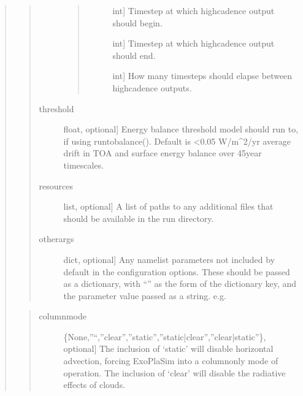 \documentclass[letterpaper,10pt,english]{sphinxmanual}
\begin{document}
\begin{fulllineitems}
\begin{fulllineitems}
\begin{quote}
\begin{quote}
\begin{description}
\begin{quote}
\begin{description}
\item[{}] \leavevmode{[}int{]}
Timestep at which high\sphinxhyphen{}cadence output should begin.

\item[{}] \leavevmode{[}int{]}
Timestep at which high\sphinxhyphen{}cadence output should end.

\item[{}] \leavevmode{[}int{]}
How many timesteps should elapse between high\sphinxhyphen{}cadence outputs.

\end{description}
\end{quote}

\item[{threshold}] \leavevmode{[}float, optional{]}
Energy balance threshold model should run to, if using runtobalance().
Default is \textless{}0.05 W/m\textasciicircum{}2/yr average drift in TOA and surface energy balance
over 45\sphinxhyphen{}year timescales.

\item[{resources}] \leavevmode{[}list, optional{]}
A list of paths to any additional files that should be available in the
run directory.

\item[{otherargs}] \leavevmode{[}dict, optional{]}
Any namelist parameters not included by default in the configuration options.
These should be passed as a dictionary, with “” as the
form of the dictionary key, and the parameter value passed as a string.
e.g. 

\end{description}
\end{quote}

\begin{quote}
\begin{description}
\item[{columnmode}] \leavevmode{[}\{None,”\sphinxhyphen{}“,”clear”,”static”,”static|clear”,”clear|static”\}, optional{]}
The inclusion of ‘static’ will disable horizontal advection, forcing ExoPlaSim
into a column\sphinxhyphen{}only mode of operation. The inclusion of ‘clear’ will disable
the radiative effects of clouds.


\end{description}
\end{quote}
\end{quote}
\end{fulllineitems}
\end{fulllineitems}
\end{document}
